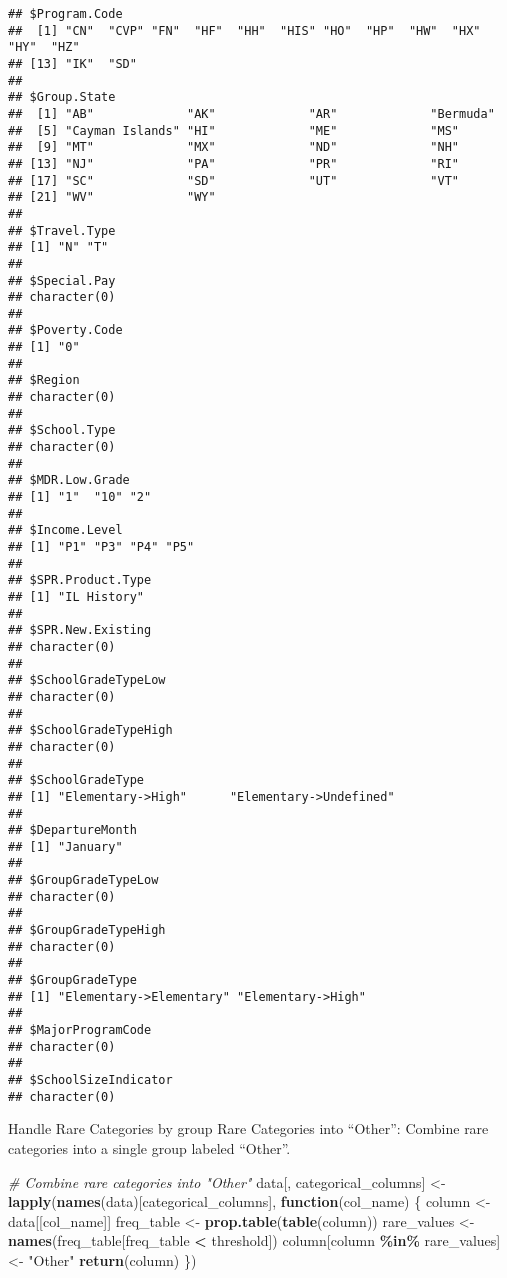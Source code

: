 \documentclass[
]{article}
\newenvironment{Shaded}{\begin{snugshade}}{\end{snugshade}}
\newcommand{\CommentTok}[1]{\textcolor[rgb]{0.56,0.35,0.01}{\textit{#1}}}
\newcommand{\ControlFlowTok}[1]{\textcolor[rgb]{0.13,0.29,0.53}{\textbf{#1}}}
\newcommand{\FunctionTok}[1]{\textcolor[rgb]{0.13,0.29,0.53}{\textbf{#1}}}
\newcommand{\NormalTok}[1]{#1}
\newcommand{\OtherTok}[1]{\textcolor[rgb]{0.56,0.35,0.01}{#1}}
\newcommand{\SpecialCharTok}[1]{\textcolor[rgb]{0.81,0.36,0.00}{\textbf{#1}}}
\newcommand{\StringTok}[1]{\textcolor[rgb]{0.31,0.60,0.02}{#1}}
\begin{document}
\begin{verbatim}
## $Program.Code
##  [1] "CN"  "CVP" "FN"  "HF"  "HH"  "HIS" "HO"  "HP"  "HW"  "HX"  "HY"  "HZ" 
## [13] "IK"  "SD" 
## 
## $Group.State
##  [1] "AB"             "AK"             "AR"             "Bermuda"       
##  [5] "Cayman Islands" "HI"             "ME"             "MS"            
##  [9] "MT"             "MX"             "ND"             "NH"            
## [13] "NJ"             "PA"             "PR"             "RI"            
## [17] "SC"             "SD"             "UT"             "VT"            
## [21] "WV"             "WY"            
## 
## $Travel.Type
## [1] "N" "T"
## 
## $Special.Pay
## character(0)
## 
## $Poverty.Code
## [1] "0"
## 
## $Region
## character(0)
## 
## $School.Type
## character(0)
## 
## $MDR.Low.Grade
## [1] "1"  "10" "2" 
## 
## $Income.Level
## [1] "P1" "P3" "P4" "P5"
## 
## $SPR.Product.Type
## [1] "IL History"
## 
## $SPR.New.Existing
## character(0)
## 
## $SchoolGradeTypeLow
## character(0)
## 
## $SchoolGradeTypeHigh
## character(0)
## 
## $SchoolGradeType
## [1] "Elementary->High"      "Elementary->Undefined"
## 
## $DepartureMonth
## [1] "January"
## 
## $GroupGradeTypeLow
## character(0)
## 
## $GroupGradeTypeHigh
## character(0)
## 
## $GroupGradeType
## [1] "Elementary->Elementary" "Elementary->High"      
## 
## $MajorProgramCode
## character(0)
## 
## $SchoolSizeIndicator
## character(0)
\end{verbatim}

Handle Rare Categories by group Rare Categories into ``Other'': Combine
rare categories into a single group labeled ``Other''.

\begin{Shaded}
\begin{Highlighting}[]
\CommentTok{\# Combine rare categories into "Other"}
\NormalTok{data[, categorical\_columns] }\OtherTok{\textless{}{-}} \FunctionTok{lapply}\NormalTok{(}\FunctionTok{names}\NormalTok{(data)[categorical\_columns], }\ControlFlowTok{function}\NormalTok{(col\_name) \{}
\NormalTok{  column }\OtherTok{\textless{}{-}}\NormalTok{ data[[col\_name]]}
\NormalTok{  freq\_table }\OtherTok{\textless{}{-}} \FunctionTok{prop.table}\NormalTok{(}\FunctionTok{table}\NormalTok{(column))}
\NormalTok{  rare\_values }\OtherTok{\textless{}{-}} \FunctionTok{names}\NormalTok{(freq\_table[freq\_table }\SpecialCharTok{\textless{}}\NormalTok{ threshold])}
\NormalTok{  column[column }\SpecialCharTok{\%in\%}\NormalTok{ rare\_values] }\OtherTok{\textless{}{-}} \StringTok{"Other"}
  \FunctionTok{return}\NormalTok{(column)}
\NormalTok{\})}
\end{Highlighting}
\end{Shaded}
\end{document}
